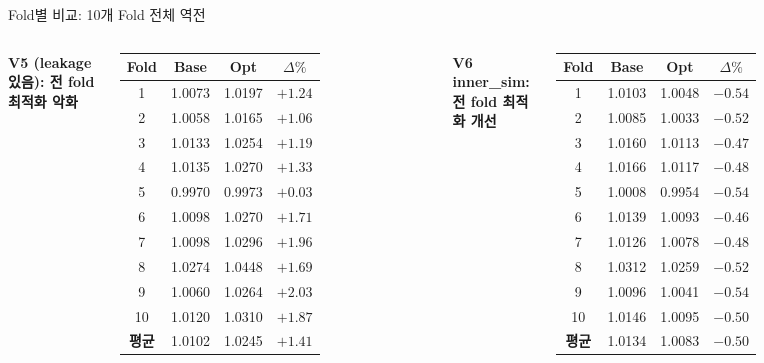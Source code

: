 \documentclass[aspectratio=169,10pt]{beamer}
\begin{document}
\begin{frame}[shrink=5]{Fold별 비교: 10개 Fold 전체 역전}
	\begin{columns}[T]
			\textbf{V5 (leakage 있음): 전 fold 최적화 악화}
			\renewcommand{\arraystretch}{1.2}
			\begin{tabular}{c|c|c|c}
				\toprule
				Fold & Base & Opt & $\Delta\%$ \\
				\midrule
				1  & 1.0073 & 1.0197 & \textcolor{negred}{$+1.24$} \\
				2  & 1.0058 & 1.0165 & \textcolor{negred}{$+1.06$} \\
				3  & 1.0133 & 1.0254 & \textcolor{negred}{$+1.19$} \\
				4  & 1.0135 & 1.0270 & \textcolor{negred}{$+1.33$} \\
				5  & 0.9970 & 0.9973 & \textcolor{negred}{$+0.03$} \\
				6  & 1.0098 & 1.0270 & \textcolor{negred}{$+1.71$} \\
				7  & 1.0098 & 1.0296 & \textcolor{negred}{$+1.96$} \\
				8  & 1.0274 & 1.0448 & \textcolor{negred}{$+1.69$} \\
				9  & 1.0060 & 1.0264 & \textcolor{negred}{$+2.03$} \\
				10 & 1.0120 & 1.0310 & \textcolor{negred}{$+1.87$} \\
				\midrule
				\textbf{평균} & 1.0102 & 1.0245 & \textcolor{negred}{$+1.41$} \\
				\bottomrule
			\end{tabular}

			\textbf{V6 inner\_sim: 전 fold 최적화 개선}
			\renewcommand{\arraystretch}{1.2}
			\begin{tabular}{c|c|c|c}
				\toprule
				Fold & Base & Opt & $\Delta\%$ \\
				\midrule
				1  & 1.0103 & 1.0048 & \textcolor{testgreen}{$-0.54$} \\
				2  & 1.0085 & 1.0033 & \textcolor{testgreen}{$-0.52$} \\
				3  & 1.0160 & 1.0113 & \textcolor{testgreen}{$-0.47$} \\
				4  & 1.0166 & 1.0117 & \textcolor{testgreen}{$-0.48$} \\
				5  & 1.0008 & 0.9954 & \textcolor{testgreen}{$-0.54$} \\
				6  & 1.0139 & 1.0093 & \textcolor{testgreen}{$-0.46$} \\
				7  & 1.0126 & 1.0078 & \textcolor{testgreen}{$-0.48$} \\
				8  & 1.0312 & 1.0259 & \textcolor{testgreen}{$-0.52$} \\
				9  & 1.0096 & 1.0041 & \textcolor{testgreen}{$-0.54$} \\
				10 & 1.0146 & 1.0095 & \textcolor{testgreen}{$-0.50$} \\
				\midrule
				\textbf{평균} & 1.0134 & 1.0083 & \textcolor{testgreen}{$-0.50$} \\
				\bottomrule
			\end{tabular}
	\end{columns}
\end{frame}
\end{document}
